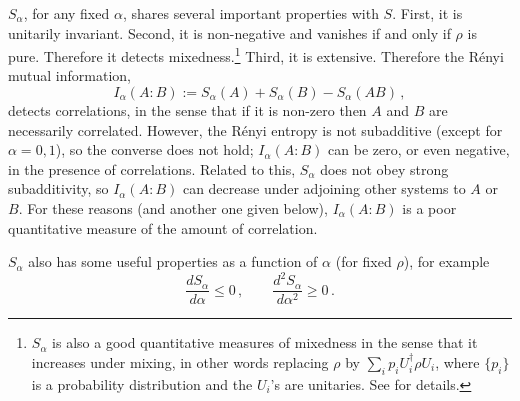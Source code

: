 \documentclass[11pt]{article}
\begin{document}
$S_\alpha$, for any fixed $\alpha$, shares several important properties with $S$. First, it is unitarily invariant. Second, it is non-negative and vanishes if and only if $\rho$ is pure. Therefore it detects mixedness.\footnote{$S_\alpha$ is also a good quantitative measures of mixedness in the sense that it increases under mixing, in other words replacing $\rho$ by $\sum_ip_iU_i^\dag\rho U_i$, where $\{p_i\}$ is a probability distribution and the $U_i$'s are unitaries. See \cite{Wehrl} for details.} Third, it is extensive. Therefore the R\'enyi mutual information,
\begin{equation}
I_\alpha(A:B):=S_\alpha(A)+S_\alpha(B)-S_\alpha(AB)\,,
\end{equation}
detects correlations, in the sense that if it is non-zero then $A$ and $B$ are necessarily correlated. However, the R\'enyi entropy is not subadditive (except for $\alpha=0,1$), so the converse does not hold; $I_\alpha(A:B)$ can be zero, or even negative, in the presence of correlations. Related to this, $S_\alpha$ does not obey strong subadditivity, so $I_\alpha(A:B)$ can decrease under adjoining other systems to $A$ or $B$. For these reasons (and another one given below), $I_\alpha(A:B)$ is a poor quantitative measure of the amount of correlation.

$S_\alpha$ also has some useful properties as a function of $\alpha$ (for fixed $\rho$), for example
\begin{equation}
\frac{dS_\alpha}{d\alpha} \le0\,,\qquad
\frac{d^2S_\alpha}{d\alpha^2} \ge0\,.
\end{equation}
\end{document}
